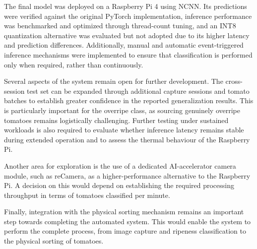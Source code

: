 \documentclass[12pt,a4paper]{report}
\begin{document}
The final model was deployed on a Raspberry Pi 4 using NCNN. Its predictions were verified against the original PyTorch implementation, inference performance was benchmarked and optimized through thread-count tuning, and an INT8 quantization alternative was evaluated but not adopted due to its higher latency and prediction differences. Additionally, manual and automatic event-triggered inference mechanisms were implemented to ensure that classification is performed only when required, rather than continuously.

Several aspects of the system remain open for further development. The cross-session test set can be expanded through additional capture sessions and tomato batches to establish greater confidence in the reported generalization results. This is particularly important for the overripe class, as sourcing genuinely overripe tomatoes remains logistically challenging. Further testing under sustained workloads is also required to evaluate whether inference latency remains stable during extended operation and to assess the thermal behaviour of the Raspberry Pi.

Another area for exploration is the use of a dedicated AI-accelerator camera module, such as reCamera, as a higher-performance alternative to the Raspberry Pi. A decision on this would depend on establishing the required processing throughput in terms of tomatoes classified per minute.

Finally, integration with the physical sorting mechanism remains an important step towards completing the automated system. This would enable the system to perform the complete process, from image capture and ripeness classification to the physical sorting of tomatoes.
\end{document}
